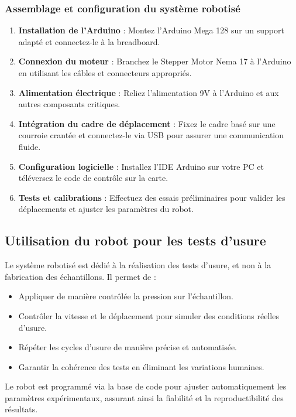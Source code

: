 \documentclass[a4paper,12pt]{article}
\begin{document}
\subsubsection{Assemblage et configuration du système robotisé}
\begin{enumerate}
    \item \textbf{Installation de l'Arduino} : Montez l'Arduino Mega 128 sur un support adapté et connectez-le à la breadboard.
    \item \textbf{Connexion du moteur} : Branchez le Stepper Motor Nema 17 à l'Arduino en utilisant les câbles et connecteurs appropriés.
    \item \textbf{Alimentation électrique} : Reliez l'alimentation 9V à l'Arduino et aux autres composants critiques.
    \item \textbf{Intégration du cadre de déplacement} : Fixez le cadre basé sur une courroie crantée et connectez-le via USB pour assurer une communication fluide.
    \item \textbf{Configuration logicielle} : Installez l'IDE Arduino sur votre PC et téléversez le code de contrôle sur la carte.
    \item \textbf{Tests et calibrations} : Effectuez des essais préliminaires pour valider les déplacements et ajuster les paramètres du robot.
\end{enumerate}

\subsection{Utilisation du robot pour les tests d'usure}
Le système robotisé est dédié à la réalisation des tests d'usure, et non à la fabrication des échantillons. Il permet de :
\begin{itemize}
    \item Appliquer de manière contrôlée la pression sur l'échantillon.
    \item Contrôler la vitesse et le déplacement pour simuler des conditions réelles d'usure.
    \item Répéter les cycles d'usure de manière précise et automatisée.
    \item Garantir la cohérence des tests en éliminant les variations humaines.
\end{itemize}
Le robot est programmé via la base de code pour ajuster automatiquement les paramètres expérimentaux, assurant ainsi la fiabilité et la reproductibilité des résultats.
\end{document}
